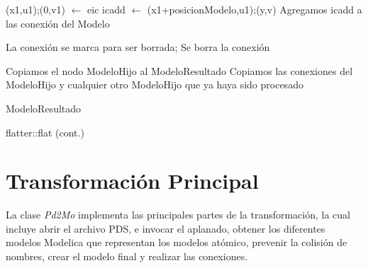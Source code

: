 \begin{algorithm}[H]
\begin{algorithmic}[1]
							\State (x1,u1);(0,v1) $\gets$ eic
								\State icadd $\gets$ (x1+posicionModelo,u1);(y,v)
								\State Agregamos icadd a las conexión del Modelo
							\EndIf

						\EndFor

  			 			\State La conexión se marca para ser borrada;
					\EndIf
						\State Se borra la conexión
					\EndIf
				\EndFor
		\EndFor
  	\Else

  		\State Copiamos el nodo ModeloHijo al ModeloResultado 
  		\State Copiamos las conexiones del ModeloHijo y cualquier otro ModeloHijo que ya haya sido procesado

	\EndIf
\EndFor
\State \Return ModeloResultado
\end{algorithmic}
\caption{flatter::flat (cont.)}
\end{algorithm}

\section{Transformación Principal}
La clase \emph{Pd2Mo} implementa las principales partes de la transformación, la cual incluye abrir el archivo PDS, e invocar el aplanado, obtener los diferentes modelos Modelica que representan los modelos atómico, prevenir la colisión de nombres, crear el modelo final y realizar las conexiones.


